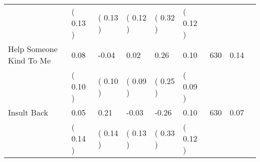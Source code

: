 \begin{tabular}{L{6.2cm} C{1.8cm} C{1.8cm} C{1.8cm} C{1.8cm} C{1.8cm} C{1.8cm} C{0.3cm} C{0.3cm}}
 & (     0.13 ) & (     0.13 ) & (     0.12 ) & (     0.32 ) & (     0.12 )  & \\
Help Someone Kind To Me &      0.08 &     -0.04 &      0.02 &      0.26 &      0.10  & 630 &       0.14 \\ 
 & (     0.10 ) & (     0.10 ) & (     0.09 ) & (     0.25 ) & (     0.09 )  & \\
Insult Back &      0.05 &      0.21 &     -0.03 &     -0.26 &      0.10  & 630 &       0.07 \\ 
 & (     0.14 ) & (     0.14 ) & (     0.13 ) & (     0.33 ) & (     0.12 )  & \\
\bottomrule
\end{tabular}
